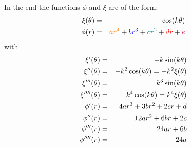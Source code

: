 \noindent In the end the functions $\phi$ and $\xi$ are of the form:
\begin{eqnarray}
\xi(\theta) &=& \cos (k\theta) \\
\phi(r) &=& {\color{orange}ar^4}+{\color{blue}br^3}+
{\color{teal}cr^2}+{\color{red} dr}+ {\color{purple}e}
\end{eqnarray}
with
\begin{eqnarray}
\xi'(\theta) &=& -k \sin (k\theta) \nonumber\\
\xi''(\theta) &=& -k^2 \cos (k\theta) = -k^2 \xi(\theta)\nonumber\\
\xi'''(\theta) &=& k^3 \sin (k\theta)\nonumber\\
\xi''''(\theta) &=& k^4\cos (k\theta) = k^4 \xi(\theta)\nonumber\\
\phi'(r) &=& 4ar^3+3br^2 +2cr + d \nonumber\\
\phi''(r) &=& 12 ar^2 + 6 br + 2c \nonumber\\
\phi'''(r) &=& 24 ar + 6b \nonumber\\
\phi''''(r) &=& 24a \nonumber
\end{eqnarray}


